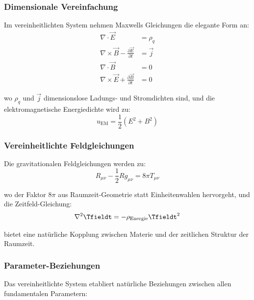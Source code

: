 	\subsubsection{Dimensionale Vereinfachung}
	\label{subsubsec:dimensional_simplification}
	
	Im vereinheitlichten System nehmen Maxwells Gleichungen die elegante Form an:
	\begin{align}
		\nabla \cdot \vec{E} &= \rho_q \\
		\nabla \times \vec{B} - \frac{\partial \vec{E}}{\partial t} &= \vec{j} \\
		\nabla \cdot \vec{B} &= 0 \\
		\nabla \times \vec{E} + \frac{\partial \vec{B}}{\partial t} &= 0
	\end{align}
	
	wo $\rho_q$ und $\vec{j}$ dimensionslose Ladungs- und Stromdichten sind, und die elektromagnetische Energiedichte wird zu:
	\begin{equation}
		u_{\text{EM}} = \frac{1}{2}(E^2 + B^2)
	\end{equation}
	
	\subsubsection{Vereinheitlichte Feldgleichungen}
	\label{subsubsec:unified_field_equations}
	
	Die gravitationalen Feldgleichungen werden zu:
	\begin{equation}
		R_{\mu\nu} - \frac{1}{2}Rg_{\mu\nu} = 8\pi T_{\mu\nu}
	\end{equation}
	
	wo der Faktor $8\pi$ aus Raumzeit-Geometrie statt Einheitenwahlen hervorgeht, und die Zeitfeld-Gleichung:
	\begin{equation}
		\nabla^2 \Tfieldt = -\rho_{\text{Energie}} \Tfieldt^2
	\end{equation}
	
	bietet eine natürliche Kopplung zwischen Materie und der zeitlichen Struktur der Raumzeit.
	
	\subsubsection{Parameter-Beziehungen}
	\label{subsubsec:parameter_relationships}
	
	Das vereinheitlichte System etabliert natürliche Beziehungen zwischen allen fundamentalen Parametern:
	
